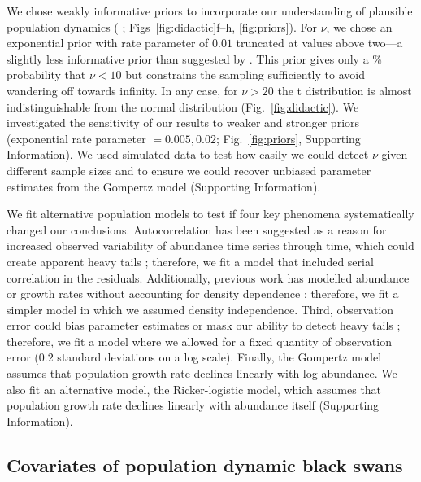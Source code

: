 We chose weakly informative priors to incorporate our understanding of
plausible population dynamics (\citeauthor{gelman2014} \citeyear{gelman2014};
Figs~\ref{fig:didactic}f--h, \ref{fig:priors}). For $\nu$, we chose an
exponential prior with rate parameter of $0.01$ truncated at values above
two---a slightly less informative prior than suggested by
\citet{fernandez1998}. This prior gives only a \basePriorProbHeavy \%
probability that $\nu < 10$ but constrains the sampling sufficiently to avoid
wandering off towards infinity. In any case, for $\nu > 20$ the t distribution
is almost indistinguishable from the normal distribution
(Fig.~\ref{fig:didactic}). We investigated the sensitivity of our results to
weaker and stronger priors (exponential rate parameter $= 0.005, 0.02$;
Fig.~\ref{fig:priors}, Supporting Information). We used simulated data to test
how easily we could detect $\nu$ given different sample sizes and to ensure we
could recover unbiased parameter estimates from the Gompertz model (Supporting
Information).

We fit alternative population models to test if four key phenomena
systematically changed our conclusions. Autocorrelation has been suggested as
a reason for increased observed variability of abundance time series through
time, which could create apparent heavy tails \citep{inchausti2002};
therefore, we fit a model that included serial correlation in the residuals.
Additionally, previous work has modelled abundance or growth rates without
accounting for density dependence \citep{halley2002,segura2013}; therefore, we
fit a simpler model in which we assumed density independence. Third,
observation error could bias parameter estimates \citep{knape2012} or mask our
ability to detect heavy tails \citep{ward2007}; therefore, we fit a model
where we allowed for a fixed quantity of observation error ($0.2$ standard
deviations on a log scale). Finally, the Gompertz model assumes that
population growth rate declines linearly with log abundance. We also fit an
alternative model, the Ricker-logistic model, which assumes that population
growth rate declines linearly with abundance itself (Supporting Information).

\subsection{Covariates of population dynamic black swans}


